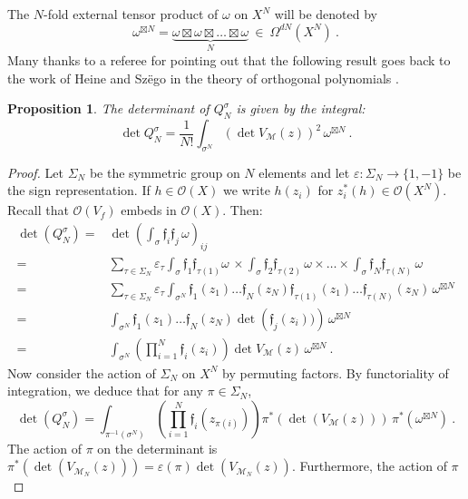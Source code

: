 \documentclass[a4paper,10pt]{amsart}
\newtheorem{prop}[thm]{Proposition}
\theoremstyle{definition}
\theoremstyle{remark}
\numberwithin{equation}{section}
\newcommand{\Or}{\mathcal{O}}
\newcommand{\ff}{\mathfrak{f}}
\newcommand{\0}{\color{blue}{\mathsf{0}}}
\begin{document}
The $N$-fold  external tensor product of $\omega$   on $X^{N}$ will be denoted by
\[ \omega^{\boxtimes  N  } = \underbrace{\omega \boxtimes \omega \boxtimes \ldots \boxtimes \omega}_{N}  \  \in  \ \Omega^{dN}(X^N) \ . \]
Many thanks to a referee for pointing out that the following result goes back to the work of Heine and Sz\"ego in the theory of orthogonal polynomials \cite{Andreief1883}. 
\begin{prop} \label{propdetQub}  The determinant of $Q^{\sigma}_N$ is given by the integral:
\begin{equation}  \label{secondformulaDetQ} 
   \det Q^{\sigma}_{N} =  \frac{1}{N!} \int_{\sigma^{N}}  \left(  \det  V_{\mathcal{M}}(z) \right)^2\,     \omega^{\boxtimes  N}  \ . 
  \end{equation}
\end{prop} 
\begin{proof} 
Let $\Sigma_N$ be the symmetric group on $N$ elements and let  $\varepsilon: \Sigma_N \rightarrow \{1,-1\}$ be the sign representation.  If $h\in \Or(X)$    we write $h(z_i)$ for $z_i^*(h) \in \Or(X^N)$.  Recall that $\mathcal{O}(V_f)$ embeds in $\Or(X)$. Then:
\begin{align*}
\det(Q^{\sigma}_N)  = &  \det \left(  \int_{\sigma}  \ff_{i} \ff_{j}  \,  \omega  \right)_{ij} \\
 = &   \sum_{\tau \in \Sigma_N} \varepsilon_{\tau} \int_{\sigma} \ff_{1} \ff_{\tau(1)} \omega   \, \times   \int_{\sigma} \ff_{2} \ff_{\tau(2)}  \,   \omega \times  \ldots  \times \int_{\sigma} \ff_{N} \ff_{\tau(N)}   \,\omega\\
 = & \sum_{\tau \in \Sigma_N} \varepsilon_{\tau} \int_{\sigma^N} \ff_1(z_1)  \ldots \ff_N(z_N)   \ff_{\tau(1)}(z_1)   \ldots \ff_{\tau(N)}(z_N)   \,  \omega^{\boxtimes N}\\
 = &  \int_{\sigma^N} \ff_1(z_1)  \ldots \ff_N(z_N)   \det\left(  \ff_j(z_i)     ) \right)   \,  \omega^{\boxtimes N}  \\  
= &     \int_{\sigma^{N}}     \left(  \prod_{i=1}^N   \ff_i(z_i )  \right) \det  V_{\mathcal{M}} (z)      \,     \omega^{\boxtimes N } \ .
\end{align*} 
Now consider the action of $\Sigma_N$ on $X^{N}$ by permuting factors. By functoriality of integration, we deduce that  for any $\pi \in \Sigma_N$, 
\[   \det(Q^{\sigma}_N)  =   \int_{\pi^{-1}( \sigma^{N})}   \left( \prod_{i=1}^N   \ff_i(z_{\pi(i)} )  \right)  \pi^*\left( \det  (V_{\mathcal{M}} (z) )\right)     \,    \pi^*( \omega^{\boxtimes N })\ . \]
The action of $\pi$ on the determinant is  $ \pi^*\left( \det  (V_{\mathcal{M}_N} (z) )\right)= \varepsilon(\pi)   \det  (V_{\mathcal{M}_N} (z) )$.  Furthermore, the action of $\pi$ 

\end{proof}
\end{document}
